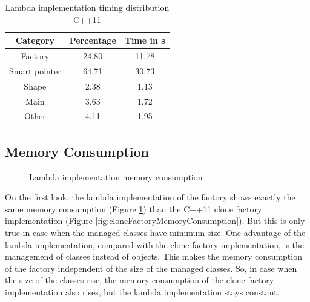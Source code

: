 {\begin{table}[h]\begin{center}
\begin{tabular}{|c|c|c|}\hline
\textbf{Category} & \textbf{Percentage} & \textbf{Time in s}\\
\hline
Factory & 24.80 & 11.78\\
\hline
Smart pointer & 64.71 & 30.73\\
\hline
Shape & 2.38 & 1.13\\
\hline
Main & 3.63 & 1.72\\
\hline
Other & 4.11 & 1.95\\
\hline
\end{tabular}
\caption{Lambda implementation timing distribution C++11}
\label{tab:LambdaFactoryTimingDistributionCpp11}
\end{center}\end{table}

\FloatBarrier

\subsection{Memory Consumption}\label{sec:memoryConsumptionLambdaFactory}

\begin{figure}[h]{}
\centering
\mbox{}
\caption{Lambda implementation memory consumption}
\label{fig:lambdaImplementationMemoryConsumption}
\end{figure}

\noindent On the first look, the lambda implementation of the factory shows exactly the same memory consumption (Figure \ref{fig:lambdaImplementationMemoryConsumption}) than the C++11 clone factory implementation (Figure \ref{fig:cloneFactoryMemoryConsumption}). But this is only true in case when the managed classes have minimum size. One advantage of the lambda implementation, compared with the clone factory implementation, is the managemend of classes instead of objects. This makes the memory consumption of the factory independent of the size of the managed classes. So, in case when the size of the classes rise, the memory consumption of the clone factory implementation also rises, but the lambda implementation stays constant.
\endgroup}
